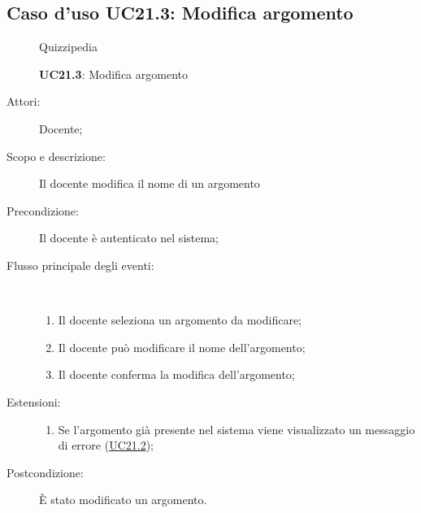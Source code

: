\subsection{Caso d'uso UC21.3: Modifica argomento}
	\begin{figure}[H]
		\centering
		\begin{resizedtikzpicture}{\textwidth}
		\begin{umlsystem}[x=0, fill=lightgray!20]{Quizzipedia}
		\end{umlsystem}
		\end{resizedtikzpicture}
		\caption{\textbf{UC21.3}: Modifica argomento}
		\label{UC21.3}
	\end{figure}
\begin{description}
\item[Attori:] Docente;
\item[Scopo e descrizione:] Il docente modifica il nome di un argomento
      \item[Precondizione:] Il docente è autenticato nel sistema;

        \item[Flusso principale degli eventi:] \ 
 \begin{enumerate}
          \item Il docente seleziona un argomento da modificare;
          \item Il docente può modificare il nome dell'argomento;
          \item Il docente conferma la modifica dell'argomento;

      \end{enumerate}
    \item[Estensioni:]
      \begin{enumerate}
          \item Se l'argomento già presente nel sistema viene visualizzato un messaggio di errore (\hyperlink{UC21.2}{UC21.2});

      \end{enumerate}
    \item[Postcondizione:] È stato modificato un argomento.
  \end{description}
\hypertarget{UC21.4}{}
